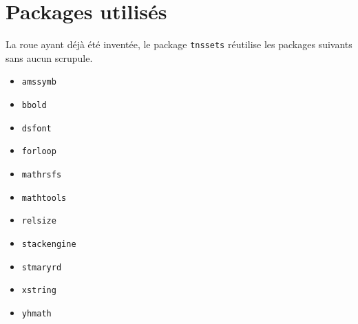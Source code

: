 \documentclass[12pt,a4paper]{article}
\begin{document}
\section{Packages utilisés}

La roue ayant déjà été inventée, le package \verb#tnssets# réutilise les packages suivants sans aucun scrupule.

\begin{multicols}{4}
    \begin{itemize}
        \item \verb#amssymb#
        \item \verb#bbold#
        \item \verb#dsfont#
        \item \verb#forloop#
        \item \verb#mathrsfs#
        \item \verb#mathtools#
        \item \verb#relsize#
        \item \verb#stackengine#
        \item \verb#stmaryrd#
        \item \verb#xstring#
        \item \verb#yhmath#
    \end{itemize}
\end{multicols}
\end{document}
